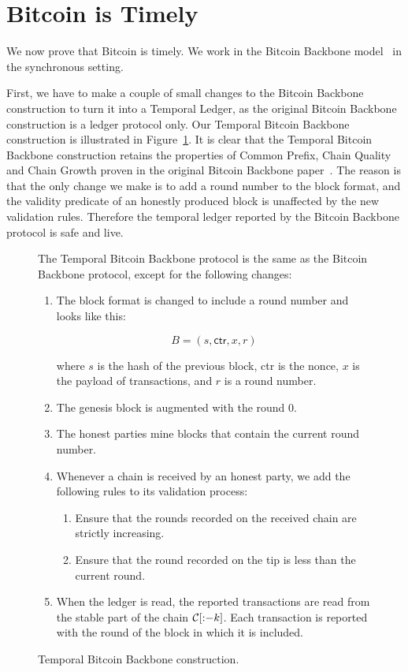 \section{Bitcoin is Timely}

We now prove that Bitcoin is timely. We work in the Bitcoin Backbone model~\cite{backbone}
in the synchronous setting.

First, we have to make a couple of small changes to the Bitcoin Backbone construction to turn it
into a Temporal Ledger, as the original Bitcoin Backbone construction is a ledger protocol only.
Our Temporal Bitcoin Backbone construction is illustrated in Figure~\ref{fig.temporal-backbone}.
It is clear that the Temporal Bitcoin Backbone construction retains the properties of Common Prefix,
Chain Quality and Chain Growth proven in the original Bitcoin Backbone paper~\cite{backbone}.
The reason is that the only change we make is to add a round number to the block format, and
the validity predicate of an honestly produced block is unaffected by the new validation rules.
Therefore the temporal ledger reported by the Bitcoin Backbone protocol is safe and live.

\begin{figure}

  The Temporal Bitcoin Backbone protocol is the same as the Bitcoin Backbone protocol, except
  for the following changes:

  \begin{enumerate}
    \item The block format is changed to include a round number and looks like this:

    \[
      B = (s, \textsf{ctr}, x, r)
    \]

    where $s$ is the hash of the previous block, \textsf{ctr} is the nonce, $x$ is the
    payload of transactions, and $r$ is a round number.

    \item The genesis block is augmented with the round $0$.
    \item The honest parties mine blocks that contain the current round number.
    \item Whenever a chain is received by an honest party, we add the following rules to
          its validation process:

          \begin{enumerate}
            \item Ensure that the rounds recorded on the received chain are strictly
                  increasing.
            \item Ensure that the round recorded on the tip is less than the current round.
          \end{enumerate}
    \item When the ledger is \textsf{read}, the reported transactions are read from the
          stable part of the chain $\mathcal{C}[{:}{-k}]$. Each transaction is reported with the
          round of the block in which it is included.
  \end{enumerate}
  \caption{Temporal Bitcoin Backbone construction.}
  \label{fig.temporal-backbone}
\end{figure}

